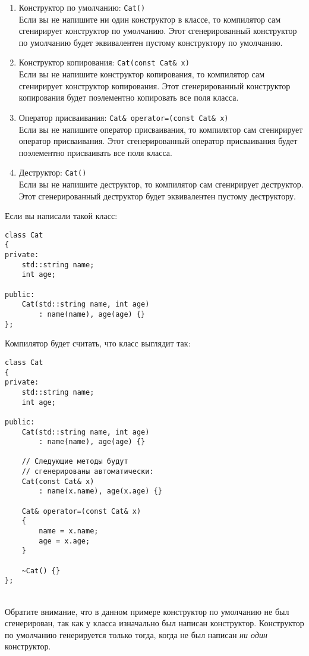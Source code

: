 \documentclass{article}
\newcommand{\mytilde}{\raisebox{0.5ex}{\texttildelow}}
\begin{document}
\begin{enumerate}
\item Конструктор по умолчанию: \texttt{Cat()}\\
Если вы не напишите ни один конструктор в классе, то компилятор сам сгенирирует конструктор по умолчанию. Этот сгенерированный конструктор по умолчанию будет эквивалентен пустому конструктору по умолчанию.

\item Конструктор копирования: \texttt{Cat(const Cat\& x)}\\
Если вы не напишите конструктор копирования, то компилятор сам сгенирирует конструктор копирования. Этот сгенерированный конструктор копирования будет поэлементно копировать все поля класса.

\item Оператор присваивания: \texttt{Cat\& operator=(const Cat\& x)}\\
Если вы не напишите оператор присваивания, то компилятор сам сгенирирует оператор присваивания. Этот сгенерированный оператор присваивания будет поэлементно присваивать все поля класса.

\item Деструктор: \texttt{\mytilde Cat()}\\
Если вы не напишите деструктор, то компилятор сам сгенирирует деструктор. Этот сгенерированный деструктор будет эквивалентен пустому деструктору.
\end{enumerate}

\begin{minipage}[t]{0.45\textwidth}
Если вы написали такой класс:
\begin{lstlisting}
class Cat
{
private:
	std::string name;
	int age;
	
public:
	Cat(std::string name, int age) 
		: name(name), age(age) {}
};
\end{lstlisting}
\end{minipage}
\begin{minipage}[t]{0.5\textwidth}
Компилятор будет считать, что класс выглядит так:
\begin{lstlisting}
class Cat
{
private:
	std::string name;
	int age;
	
public:
	Cat(std::string name, int age) 
		: name(name), age(age) {}
	
	// Следующие методы будут 
	// сгенерированы автоматически:
	Cat(const Cat& x) 
		: name(x.name), age(x.age) {}
		
	Cat& operator=(const Cat& x) 
	{
		name = x.name;
		age = x.age;
	}
	
	~Cat() {}
};
\end{lstlisting}
\end{minipage}\\
Обратите внимание, что в данном примере конструктор по умолчанию не был сгенерирован, так как у класса изначально был написан конструктор. Конструктор по умолчанию генерируется только тогда, когда не был написан \textit{ни один} конструктор.
\end{document}
